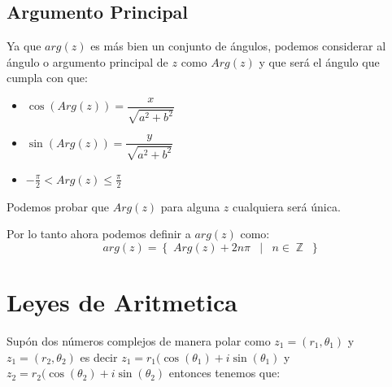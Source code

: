 \documentclass[12pt, fleqn]{report}                             %
\DeclareMathOperator \Space     {\quad}                         %
\DeclareMathOperator \MiniSpace {\;}                            %
\newcommand \Such           {\MiniSpace | \MiniSpace}           %
\theoremstyle{break}                                            %
\DeclareMathOperator \Integers     {\mathbb{Z}}                 %
\newcommand{\Set}[1]            {\left\{ \; #1 \; \right\}}     %
\newcommand{\Wrap}[1]           {\left( #1 \right)}             %
\newcommand{\Cos}[1] {\cos\Wrap{#1}}                            %
\newcommand{\Sin}[1] {\sin\Wrap{#1}}                            %
\begin{document}
            \subsection*{Argumento Principal}

                Ya que $arg(z)$ es más bien un conjunto de ángulos, podemos considerar al ángulo o 
                argumento principal de $z$ como $Arg(z)$ y que será el ángulo que cumpla con que:

                \begin{itemize}
                    \item $\Cos{Arg(z)} = \dfrac{x}{\sqrt{a^2+b^2}}$
                    \item $\Sin{Arg(z)}   = \dfrac{y}{\sqrt{a^2+b^2}}$
                    \item $-\frac{\pi}{2} < Arg(z) \leq \frac{\pi}{2}$
                \end{itemize}

                Podemos probar que $Arg(z)$ para alguna $z$ cualquiera será única.

                Por lo tanto ahora podemos definir a $arg(z)$ como:
                \begin{equation}
                    arg(z) = \Set{ Arg(z) + 2n\pi \Such n \in \Integers }
                \end{equation}


        \clearpage
        \section{Leyes de Aritmetica}
            
            Supón dos números complejos de manera polar como $z_1 = (r_1, \theta_1)$ y $z_1 = (r_2, \theta_2)$ 
            es decir $z_1 = r_1(\Cos{\theta_1} + i\Sin{\theta_1}$ y
            $z_2 = r_2(\Cos{\theta_2} + i\Sin{\theta_2}$ entonces tenemos que:
\end{document}
